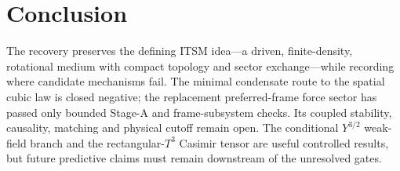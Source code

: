 \documentclass[11pt]{article}
\newcommand{\Tthree}{T^3}
\begin{document}
\section*{Conclusion}

The recovery preserves the defining ITSM idea---a driven, finite-density,
rotational medium with compact topology and sector exchange---while recording
where candidate mechanisms fail.  The minimal condensate route to the spatial
cubic law is closed negative; the replacement preferred-frame force sector has
passed only bounded Stage-A and frame-subsystem checks.  Its coupled stability,
causality, matching and physical cutoff remain open.  The conditional
$Y^{3/2}$ weak-field branch and the rectangular-$\Tthree$ Casimir tensor are
useful controlled results, but future predictive claims must remain downstream
of the unresolved gates.


\end{document}
